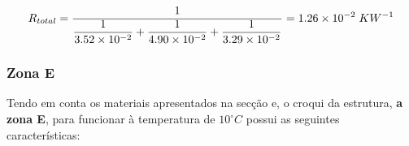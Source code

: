 \documentclass[12pt, a4paper]{article}
\begin{document}
\begin{equation}
    R_{total} = \dfrac{1}{
        \dfrac{1}{
            3.52 \times 10^{-2}
        }
        +
        \dfrac{1}{
            4.90 \times 10^{-2}
        }
        +
        \dfrac{1}{
            3.29 \times 10^{-2}
        }
    }
    = 1.26 \times 10^{-2} \hspace{1mm} KW^{-1}
    \label{eq:zona_d_total}
\end{equation}



\pagebreak
\subsubsection{Zona E}\label{ssub:Zona E}

Tendo em conta os materiais apresentados na secção e, o croqui da estrutura, \textbf{a zona E}, para funcionar
à temperatura de $ 10^\circ C $ possui as seguintes características:
\end{document}
